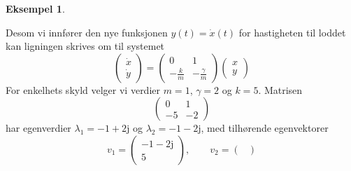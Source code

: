 \documentclass{article}
\theoremstyle{plain}
\theoremstyle{definition}
\newtheorem{eksempel}[teorem]{Eksempel}
\theoremstyle{remark}
\newcommand{\imagunit}{\mathrm{j}}
\begin{document}
\begin{eksempel}
\begin{center}
        \end{center}
    Desom vi innfører den nye funksjonen $y(t) = \dot{x}(t)$ for hastigheten til loddet kan ligningen skrives om til systemet
    \begin{equation*}
        \begin{pmatrix}
            \dot{x} \\
            \dot{y}
        \end{pmatrix}
        =
        \begin{pmatrix}
            0 & 1 \\
            -\frac{k}{m} & -\frac{\gamma}{m}
        \end{pmatrix}
        \begin{pmatrix}
            x \\
            y
        \end{pmatrix}
    \end{equation*}
    For enkelhets skyld velger vi verdier $m = 1$, $\gamma = 2$ og $k = 5$. Matrisen
    \begin{equation*}
        \begin{pmatrix}
            0 & 1 \\
            -5 & -2
        \end{pmatrix}
    \end{equation*}
    har egenverdier $\lambda_1 = -1+2 \imagunit$ og $\lambda_2 = -1-2 \imagunit$, med tilhørende egenvektorer
    \begin{equation*}
        v_1 =
        \begin{pmatrix}
            -1 - 2 \imagunit \\
            5
        \end{pmatrix},
        \qquad v_2 =
        \begin{pmatrix}

\end{pmatrix}
\end{equation*}
\end{eksempel}
\end{document}
